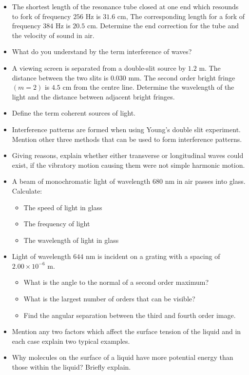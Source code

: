 \documentclass{article}
\begin{document}
\begin{itemize}
\item The shortest length of the resonance tube closed at one end which resounds to fork of frequency $ 256$ Hz is $ 31.6$ cm, The corresponding length for a fork of frequency $ 384$ Hz is $ 20.5$ cm. Determine the end correction for the tube and the velocity of sound in air. 
\item What do you understand by the term interference of waves?
\item A viewing screen is separated from a double-slit source by $ 1.2$ m. The distance between the two slits is $ 0.030$ mm. The second order bright fringe $ (m=2)$ is $ 4.5$ cm from the centre line. Determine the wavelength of the light and the distance between adjacent bright fringes. 
\item Define the term coherent sources of light. 
\item Interference patterns are formed when using Young’s double slit experiment. Mention other three methods that can be used to form interference patterns. 
\item Giving reasons, explain whether either transverse or longitudinal waves could exist, if the vibratory motion causing them were not simple harmonic motion. 
\item A beam of monochromatic light of wavelength $ 680$ nm in air passes into glass.  Calculate: 
 \begin{itemize}
\item The speed of light in glass
\item The frequency of light
\item The wavelength of light in glass
\end{itemize}
\item Light of wavelength $ 644$ nm is incident on a grating with a spacing of $ 2.00 \times 10^{-6}$ m. 
 \begin{itemize}
\item What is the angle to the normal of a second order maximum? 
\item What is the largest number of orders that can be visible? 
\item Find the angular separation between the third and fourth order image.
\end{itemize}
\item Mention any two factors which affect the surface tension of the liquid and in each case explain two typical examples. 
\item Why molecules on the surface of a liquid have more potential energy than those within the liquid? Briefly explain. 

\end{itemize}
\end{document}
